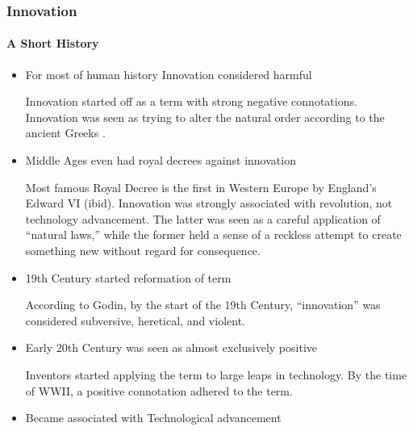 \begin{frame}
  \frametitle{Innovation}
  \framesubtitle{A Short History}
  \begin{itemize}
    \item<1-> For most of human history \alert{Innovation} considered harmful

           {\scriptsize{Innovation started off as a term with strong negative connotations.}}
           {\scriptsize{Innovation was seen as trying to alter the natural order according to the ancient Greeks \parencite{godinInnovationContestedIdea2015}.}}

    \item<2->  Middle Ages even had royal decrees against \alert{innovation}

           {\scriptsize{Most famous Royal Decree is the first in Western Europe by England's Edward VI (ibid).}}
           {\scriptsize{Innovation was strongly associated with revolution, not technology advancement. The latter was seen as a careful application of ``natural laws,'' while the former held a sense of a reckless attempt to create something new without regard for consequence.}}

    \item<3-> 19th Century started reformation of term

           {\scriptsize{According to Godin, by the start of the 19th Century, ``innovation'' was considered subversive, heretical, and violent.}}

    \item<4-> Early 20th Century was seen as almost exclusively positive

          {\scriptsize{Inventors started applying the term to large leaps in technology.}}
           {\scriptsize{By the time of WWII, a positive connotation adhered to the term.}}

    \item<5-> Became associated with Technological advancement
  \end{itemize}
\end{frame}

